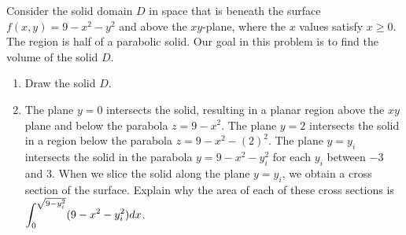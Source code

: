 \begin{problem}%
Consider the solid domain $D$ in space that is beneath the surface $f(x,y)=9-x^2-y^2$ and above the $xy$-plane, where the $x$ values satisfy $x\geq 0$.  The region is half of a parabolic solid.  Our goal in this problem is to find the volume of the solid $D$.
\begin{enumerate}
 \item Draw the solid $D$.

 \item The plane $y=0$ intersects the solid, resulting in a planar region above the $xy$ plane and below the parabola $z=9-x^2$.  The plane $y=2$ intersects the solid in a region below the parabola $z=9-x^2-(2)^2$.  The plane $y=y_i$ intersects the solid in the parabola $y=9-x^2-y_i^2$ for each $y_i$ between $-3$ and $3$. When we slice the solid along the plane $y=y_i$, we obtain a cross section of the surface.  
 Explain why the area of each of these cross sections is $\displaystyle \int_0^{\sqrt{9-y_i^2}} (9-x^2-y_i^2) dx$.


\end{enumerate}
\end{problem}
